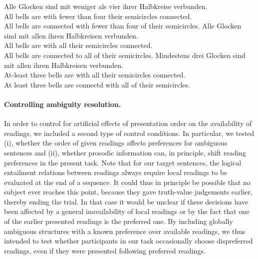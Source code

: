 \documentclass[fleqn,reqno,10pt,draft]{article}
\begin{document}
\begin{exe}
\ex \label{bsp:controls-es}
  \begin{xlist}
\ex \label{bsp:controls-es-1} \gll Alle Glocken sind mit weniger als
  vier ihrer Halbkreise verbunden. \\ 
All bells are with fewer than four their semicircles connected.\\
\trans All bells are connected with fewer than four of their semicircles.  
\ex \label{bsp:controls-es-2} \gll Alle Glocken sind mit allen ihren Halbkreisen verbunden.\\
All bells are with all their semicircles connected.\\
\trans All bells are connected to all of their semicircles. 
\ex \label{bsp:controls-es-3} \gll Mindestens drei Glocken sind mit
  allen ihren Halbkreisen verbunden.\\ 
  At-least three bells are with all  their semicircles connected.\\
  \trans At least three bells are connectd with all of their semicircles.
\end{xlist}
\end{exe}



\paragraph{Controlling ambiguity resolution.} In order to control for
artificial effects of presentation order on the availability of
readings, we included a second type of control conditions. In
particular, we tested (i), whether the order of given readings affects
preferences for ambiguous sentences and (ii), whether prosodic
information can, in principle, shift reading preferences in the
present task. Note that for our target sentences, the logical
entailment relations between readings always require local readings to
be evaluated at the end of a sequence. It could thus in principle be
possible that no subject ever reaches this point, because they gave
truth-value judgements earlier, thereby ending the trial. In that case
it would be unclear if these decisions have been affected by a general
inavailability of local readings or by the fact that one of the
earlier presented readings is the preferred one. By including globally
ambiguous structures with a known preference over available readings,
we thus intended to test whether participants in our task occasionally
choose dispreferred readings, even if they were presented following
preferred readings.
\end{document}
